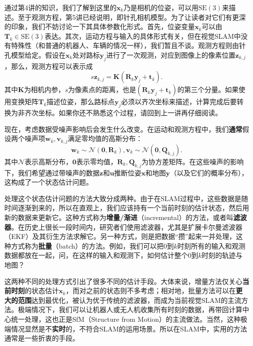 通过第4讲的知识，我们了解到这里的$\bm{x}_k$乃是相机的位姿，可以用$\mathrm{SE}(3)$来描述。至于观测方程，第5讲已经说明，即针孔相机模型。为了让读者对它们有更深的印象，我们不妨讨论一下其具体参数化形式。首先，位姿变量$\bm{x}_k$可以由$\bm{T}_k \in \mathrm{SE}(3) $表达。其次，运动方程与输入的具体形式有关，但在视觉SLAM中没有特殊性（和普通的机器人、车辆的情况一样），我们暂且不谈。观测方程则由针孔模型给定。假设在$\bm{x}_k$处对路标$\bm{y}_j$进行了一次观测，对应到图像上的像素位置$\bm{z}_{k,j}$，那么，观测方程可以表示成
\begin{equation}
s \bm{z}_{k,j}= \bm{K} (\bm{R}_k {\bm{y}_j}+\bm{t}_k).
\end{equation}
其中$\bm{K}$为相机内参，$s$为像素点的距离，也是$(\bm{R}_k {\bm{y}_j}+\bm{t}_k)$的第三个分量。如果使用变换矩阵$\bm{T}_k$描述位姿，那么路标点$\bm{y}_j$必须以齐次坐标来描述，计算完成后要转换为非齐次坐标。如果你还不熟悉这个过程，请回到上一讲再仔细阅读。

现在，考虑数据受噪声影响后会发生什么改变。在运动和观测方程中，我们\textbf{通常}假设两个噪声项$\bm{w}_k, \bm{v}_{k,j}$满足零均值的高斯分布：
\begin{equation}
{\bm{w}_k} \sim \mathcal{N}\left( {\bm{0},{\bm{R}_k}} \right),{\bm{v}_k} \sim \mathcal{N}\left( {\bm{0},{{{\bm{Q}}}_{k,j}}} \right).
\end{equation}
其中$\mathcal{N}$表示高斯分布，$\bm{0}$表示零均值，$\bm{R}_k, \bm{Q}_{k,j}$为协方差矩阵。在这些噪声的影响下，我们希望通过带噪声的数据$\bm{z}$和$\bm{u}$推断位姿$\bm{x}$和地图$\bm{y}$（以及它们的概率分布），这构成了一个状态估计问题。

处理这个状态估计问题的方法大致分成两种。由于在SLAM过程中，这些数据是随时间逐渐到来的，所以在直观上，我们应该持有一个当前时刻的估计状态，然后用新的数据来更新它。这种方式称为\textbf{增量/渐进}（incremental）的方法，或者叫\textbf{滤波器}。在历史上很长一段时间内，研究者们使用滤波器，尤其是扩展卡尔曼滤波器（EKF）及其衍生方法求解它。另一种方式，则是把数据“攒”起来一并处理，这种方式称为\textbf{批量}（batch）的方法。例如，我们可以把0到$k$时刻所有的输入和观测数据都放在一起，问，在这样的输入和观测下，如何估计整个0到$k$时刻的轨迹与地图？

这两种不同的处理方式引出了很多不同的估计手段。大体来说，增量方法仅关心\textbf{当前时刻}的状态估计$\bm{x}_k$，而对之前的状态则不多考虑；相对地，批量方法可以在\textbf{更大的范围}达到最优化，被认为优于传统的滤波器\textsuperscript{\cite{Strasdat2012}}，而成为当前视觉SLAM的主流方法。极端情况下，我们可以让机器人或无人机收集所有时刻的数据，再带回计算中心统一处理，这也正是SfM（Structure from Motion）的主流做法。当然，这种极端情况显然是不\textbf{实时}的，不符合SLAM的运用场景。所以在SLAM中，实用的方法通常是一些折衷的手段。

